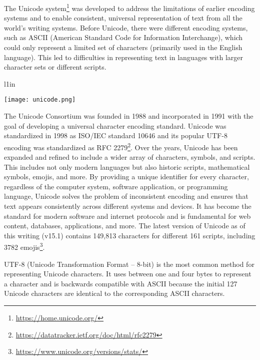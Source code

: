 The Unicode system\footnote{\url{https://home.unicode.org/}} was developed to address the limitations of earlier encoding systems and to enable consistent, universal representation of text from all the world's writing systems. Before Unicode, there were different encoding systems, such as ASCII (American Standard Code for Information Interchange), which could only represent a limited set of characters (primarily used in the English language). This led to difficulties in representing text in languages with larger character sets or different scripts. 

\begin{wrapfigure}{l}{1in}
\begin{center}
\texttt{[image: unicode.png]}
\end{center}
\end{wrapfigure}
The Unicode Consortium was founded in 1988 and incorporated in 1991 with the goal of developing a universal character encoding standard. Unicode was standardized in 1998 as ISO/IEC standard 10646 and its popular UTF-8 encoding was standardized as RFC 2279\footnote{\url{https://datatracker.ietf.org/doc/html/rfc2279}}. Over the years, Unicode has been expanded and refined to include a wider array of characters, symbols, and scripts. This includes not only modern languages but also historic scripts, mathematical symbols, emojis, and more. By providing a unique identifier for every character, regardless of the computer system, software application, or programming language, Unicode solves the problem of inconsistent encoding and ensures that text appears consistently across different systems and devices. It has become the standard for modern software and internet protocols and  is fundamental for web content, databases, applications, and more. The latest version of Unicode as of this writing (v15.1) contains 149,813 characters for different 161 scripts, including 3782 emojis\footnote{\url{https://www.unicode.org/versions/stats/}}. 

UTF-8 (Unicode Transformation Format -- 8-bit) is the most common method for representing Unicode characters. It uses between one and four bytes to represent a character and is backwards compatible with ASCII because the initial 127 Unicode characters are identical to the corresponding ASCII characters. 


